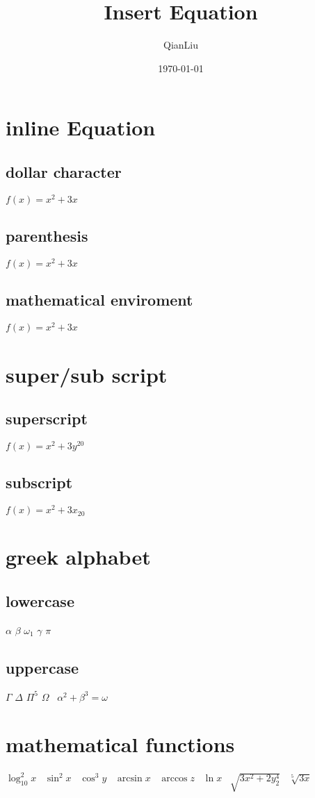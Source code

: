 \documentclass{article}
\author{QianLiu}
\title{Insert Equation}
\date{\today}
\begin{document}
    \maketitle
    \tableofcontents
    
    \section{inline Equation}
    \subsection{dollar character}
    $f(x)=x^2+3x$
    \subsection{parenthesis}
    \(f(x)=x^2+3x\)
    \subsection{mathematical enviroment}
    \begin{math}
        f(x)=x^2+3x
    \end{math}
    \section{super/sub script}
    \subsection{superscript}
    $f(x)=x^2+3y^{20}$
    \subsection{subscript}
    \(f(x)=x^2+3x_{20}\)
    \section{greek alphabet}
    \subsection{lowercase}
    \(\alpha\)
    \(\beta\)
    \(\omega_1\)
    \(\gamma\)
    \(\pi\)

    \subsection{uppercase}
    \(\Gamma\)
    \(\Delta\)
    \(\Pi^5\)
    \(\Omega\)
    \ \(\alpha^2+\beta^3=\omega\)
    \section{mathematical functions}
    \(\log_{10}^2 x\)
    \ \(\sin^2 x\)
    \ \(\cos^3 y\)
    \ \(\arcsin x\)
    \ \(\arccos z\)
    \ \(\ln x\)
    \ \(\sqrt{3x^2+2y^4_2}\)
    \ \(\sqrt[5]{3x}\)
\end{document}
